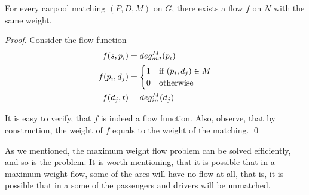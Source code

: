 \begin{observation}
For every carpool matching $(P, D, M)$ on $G$, there exists a flow $f$ on $N$
with the same weight.
\end{observation}

\begin{proof}
Consider the flow function
\begin{align*}
f(s, p_i)		& = deg^M_{out}(p_i)		 				\\
f(p_i, d_j)		& = 
				\begin{cases}
				1 & \text{if } (p_i, d_j) \in M		\\
				0 & \text{otherwise}
				\end{cases}						\\
f(d_j, t) 	& = deg^M_{in}(d_j) 
\end{align*}

It is easy to verify, that $f$ is indeed a flow function.
Also, observe, that by construction,
the weight of $f$ equals to the weight of the matching.
\qed\end{proof}

As we mentioned, 
the maximum weight flow problem can be solved efficiently, 
and so is the \FIXEDCARPOOL{} problem.
It is worth mentioning, that it is possible that in a maximum weight flow, 
some of the arcs will have no flow at all, 
that is, it is possible that in a \FIXEDCARPOOL{}
some of the passengers and drivers will be unmatched.  
